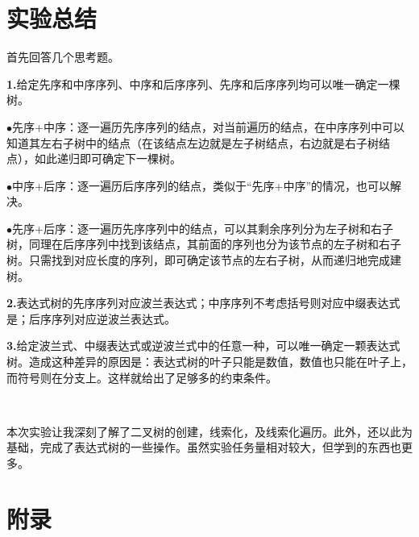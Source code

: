 \documentclass[UTF8]{article}
\newcommand{\jumpLine} {\hspace*{\fill} \\}
\begin{document}
	\section{实验总结}
	首先回答几个思考题。\par
	\textbf{1.}给定先序和中序序列、中序和后序序列、先序和后序序列均可以唯一确定一棵树。\par
	$\bullet$先序+中序：逐一遍历先序序列的结点，对当前遍历的结点，在中序序列中可以知道其左右子树中的结点（在该结点左边就是左子树结点，右边就是右子树结点），如此递归即可确定下一棵树。\par
	$\bullet$中序+后序：逐一遍历后序序列的结点，类似于“先序+中序”的情况，也可以解决。\par
	$\bullet$先序+后序：逐一遍历先序序列中的结点，可以其剩余序列分为左子树和右子树，同理在后序序列中找到该结点，其前面的序列也分为该节点的左子树和右子树。只需找到对应长度的序列，即可确定该节点的左右子树，从而递归地完成建树。\par
	\textbf{2.}表达式树的先序序列对应波兰表达式；中序序列不考虑括号则对应中缀表达式是；后序序列对应逆波兰表达式。\par
	\textbf{3.}给定波兰式、中缀表达式或逆波兰式中的任意一种，可以唯一确定一颗表达式树。造成这种差异的原因是：表达式树的叶子只能是数值，数值也只能在叶子上，而符号则在分支上。这样就给出了足够多的约束条件。\par
	\jumpLine\par
	本次实验让我深刻了解了二叉树的创建，线索化，及线索化遍历。此外，还以此为基础，完成了表达式树的一些操作。虽然实验任务量相对较大，但学到的东西也更多。\par
	
	
	
	
	
	
	
	\section{附录}
\end{document}
